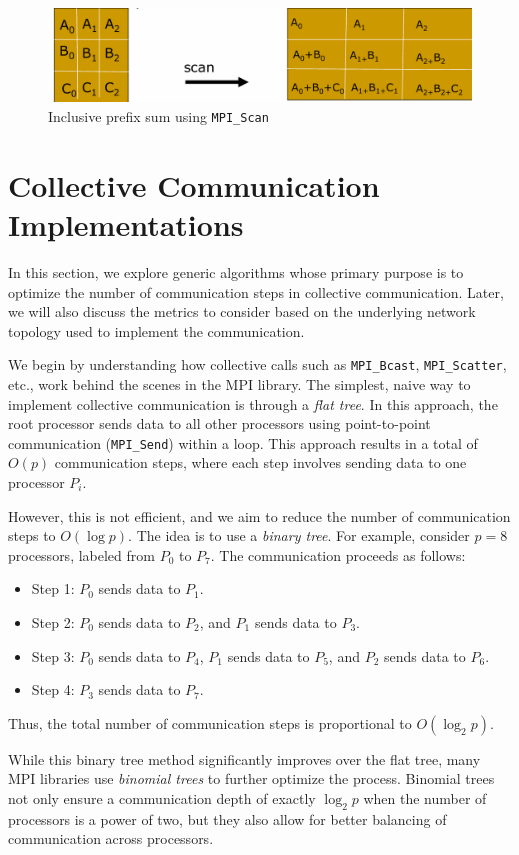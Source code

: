 \documentclass[12pt]{book}
\begin{document}
\begin{figure}[H]
    \centering
    \includegraphics[width=0.75\linewidth]{images/scan.png}
    \caption{Inclusive prefix sum using \texttt{MPI\_Scan}}
    \label{fig:scan}
\end{figure}

\section{Collective Communication Implementations}
In this section, we explore generic algorithms whose primary purpose is to optimize the number of communication steps in collective communication. Later, we will also discuss the metrics to consider based on the underlying network topology used to implement the communication.

We begin by understanding how collective calls such as \texttt{MPI\_Bcast}, \texttt{MPI\_Scatter}, etc., work behind the scenes in the MPI library. The simplest, naive way to implement collective communication is through a \textit{flat tree}. In this approach, the root processor sends data to all other processors using point-to-point communication (\texttt{MPI\_Send}) within a loop. This approach results in a total of $O(p)$ communication steps, where each step involves sending data to one processor $P_i$.

However, this is not efficient, and we aim to reduce the number of communication steps to $O(\log p)$. The idea is to use a \textit{binary tree}. For example, consider $p=8$ processors, labeled from $P_0$ to $P_7$. The communication proceeds as follows:
\begin{itemize}
    \item Step 1: $P_0$ sends data to $P_1$.
    \item Step 2: $P_0$ sends data to $P_2$, and $P_1$ sends data to $P_3$.
    \item Step 3: $P_0$ sends data to $P_4$, $P_1$ sends data to $P_5$, and $P_2$ sends data to $P_6$.
    \item Step 4: $P_3$ sends data to $P_7$.
\end{itemize}
Thus, the total number of communication steps is proportional to $O(\log_2 p)$. 

While this binary tree method significantly improves over the flat tree, many MPI libraries use \textit{binomial trees} to further optimize the process. Binomial trees not only ensure a communication depth of exactly $\log_2 p$ when the number of processors is a power of two, but they also allow for better balancing of communication across processors.
\end{document}
